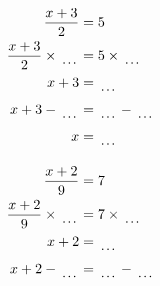 \documentclass[12pt]{article}
\newcounter{minipagecount}
\begin{document}
\begin{multicols}{2}
\begin{minipage}[t]{0.45\textwidth}
    \raggedright %
    \begin{align*} %
        \frac{x + 3}{2} &= 5\\
        \frac{x + 3}{2} \times\dotuline{\hspace{5mm}} &= 5 \times\dotuline{\hspace{5mm}}\\
        x + 3 &= \dotuline{\hspace{5mm}}\\
        x + 3 - \dotuline{\hspace{5mm}} &= \dotuline{\hspace{5mm}} - \dotuline{\hspace{5mm}}\\
        x &= \dotuline{\hspace{5mm}}\\
    \end{align*}
\end{minipage} %
\noindent{(\theminipagecount)}\hspace{0.1mm} %
\begin{minipage}[t]{0.45\textwidth} %
    \vspace{-26pt}  %
    \raggedright %
    \begin{align*} %
        \frac{x + 2}{9} &= 7\\
        \frac{x + 2}{9} \times\dotuline{\hspace{5mm}} &= 7 \times\dotuline{\hspace{5mm}}\\
        x + 2 &= \dotuline{\hspace{5mm}}\\
        x + 2 - \dotuline{\hspace{5mm}} &= \dotuline{\hspace{5mm}} - \dotuline{\hspace{5mm}}\\

\end{align*}
\end{minipage}
\end{multicols}
\end{document}
